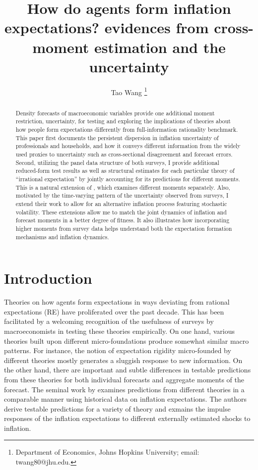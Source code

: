\documentclass[12pt]{article}
\title{How do agents form inflation expectations? evidences from cross-moment estimation and the uncertainty}
\author{Tao Wang \footnote{Department of Economics, Johns Hopkins University; email: twang80@jhu.edu. }}
\begin{document}
	
	\maketitle
	
	\begin{abstract}
	Density forecasts of macroeconomic variables provide one additional moment restriction, uncertainty, for testing and exploring the implications of theories about how people form expectations differently from full-information rationality benchmark. This paper first documents the persistent dispersion in inflation uncertainty of professionals and households, and how it conveys different information from the widely used proxies to uncertainty such as cross-sectional disagreement and forecast errors. Second, utilizing the panel data structure of both surveys, I provide additional reduced-form test results as well as structural estimates for each particular theory of ``irrational expectation'' by jointly accounting for its predictions for different moments. This is a natural extension of \citet{coibion2012can}, which examines different moments separately. Also, motivated by the time-varying pattern of the uncertainty observed from surveys, I extend their work to allow for an alternative inflation process featuring stochastic volatility. These extensions allow me to match the joint dynamics of inflation and forecast moments in a better degree of fitness. It also illustrates how incorporating higher moments from survey data helps understand both the expectation formation mechanisms and inflation dynamics.   
	\end{abstract}
	
	\newpage 
	
	\section{Introduction}
	
	
	
	Theories on how agents form expectations in ways deviating from rational expectations (RE) have proliferated over the past decade. This has been facilitated by a welcoming recognition of the usefulness of surveys by macroeconomists in testing these theories empirically. On one hand, various theories built upon different micro-foundations produce somewhat similar macro patterns. For instance, the notion of expectation rigidity micro-founded by different theories mostly generates a sluggish response to new information. On the other hand, there are important and subtle differences in testable predictions from these theories for both individual forecasts and aggregate moments of the forecast.  The seminal work by \cite{coibion2012can} examines predictions from different theories in a comparable manner using historical data on inflation expectations. The authors derive testable predictions for a variety of theory and exmains the impulse responses of the inflation expectations to different externally estimated shocks to inflation. 
	
\end{document}
